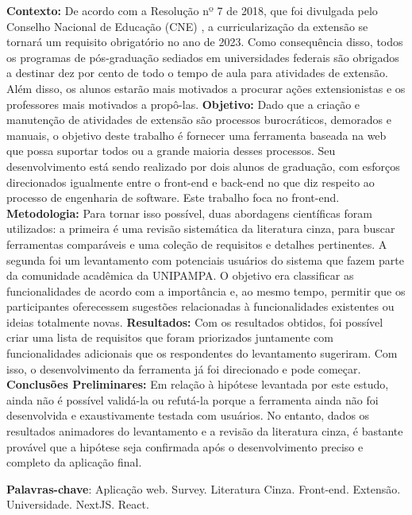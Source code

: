 \begin{resumo}
  \textbf{Contexto:} De acordo com a Resolução nº 7 de 2018, que foi divulgada pelo Conselho Nacional de Educação (CNE) \cite{Resolucao-MEC:2018}, a curricularização da extensão se tornará um requisito obrigatório no ano de 2023. Como consequência disso, todos os programas de pós-graduação sediados em universidades federais são obrigados a destinar dez por cento de todo o tempo de aula para atividades de extensão. Além disso, os alunos estarão mais motivados a procurar ações extensionistas e os professores mais motivados a propô-las. \textbf{Objetivo:} Dado que a criação e manutenção de atividades de extensão são processos burocráticos, demorados e manuais, o objetivo deste trabalho é fornecer uma ferramenta baseada na web que possa suportar todos ou a grande maioria desses processos. Seu desenvolvimento está sendo realizado por dois alunos de graduação, com esforços direcionados igualmente entre o front-end e back-end no que diz respeito ao processo de engenharia de software. Este trabalho foca no front-end. \textbf{Metodologia:} Para tornar isso possível, duas abordagens científicas foram utilizados: a primeira é uma revisão sistemática da literatura cinza, para buscar ferramentas comparáveis e uma coleção de requisitos e detalhes pertinentes. A segunda foi um levantamento com potenciais usuários do sistema que fazem parte da comunidade acadêmica da UNIPAMPA. O objetivo era classificar as funcionalidades de acordo com a importância e, ao mesmo tempo, permitir que os participantes oferecessem sugestões relacionadas à funcionalidades existentes ou ideias totalmente novas. \textbf{Resultados:} Com os resultados obtidos, foi possível criar uma lista de requisitos que foram priorizados juntamente com funcionalidades adicionais que os respondentes do levantamento sugeriram. Com isso, o desenvolvimento da ferramenta já foi direcionado e pode começar. \textbf{Conclusões Preliminares:} Em relação à hipótese levantada por este estudo, ainda não é possível validá-la ou refutá-la porque a ferramenta ainda não foi desenvolvida e exaustivamente testada com usuários. No entanto, dados os resultados animadores do levantamento e a revisão da literatura cinza, é bastante provável que a hipótese seja confirmada após o desenvolvimento preciso e completo da aplicação final.

  \vspace{\onelineskip}

  \noindent
  \textbf{Palavras-chave}: Aplicação web. Survey. Literatura Cinza. Front-end. Extensão. Universidade. NextJS. React.
\end{resumo}
